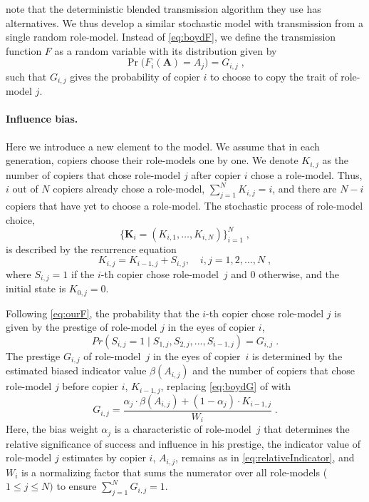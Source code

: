 \documentclass[12pt]{extarticle}
\let\vec\mathbf
\begin{document}
\citet{evolutionBook} note that the deterministic blended transmission algorithm they use has alternatives. We thus develop a similar stochastic model with transmission from a single random role-model. Instead of \cref{eq:boydF}, we define the transmission function $F$ as a random variable with its distribution given by 
\begin{equation}\label{eq:ourF}
\Pr\big(F_i(\vec{A}) = A_{j}\big) = G_{i,j} \;,
\end{equation}
such that $G_{i,j}$ gives the probability of copier $i$ to choose to copy the trait of role-model $j$.

\paragraph{Influence bias.}
Here we introduce a new element to the model.
We assume that in each generation, copiers choose their role-models one by one.
We denote $K_{i,j}$ as the number of copiers that chose role-model $j$ after copier $i$ chose a role-model. Thus, $i$ out of $N$ copiers already chose a role-model, $\sum_{j=1}^N{K_{i,j}} = i$, and there are $N-i$ copiers that have yet to choose a role-model.
The stochastic process of role-model choice, 
\begin{equation} \label{eq:process}
\big\{\vec{K}_i = (K_{i,1}, \ldots, K_{i,N}) \big\}_{i=1}^N \;,
\end{equation}
is described by the recurrence equation
\begin{equation} \label{eq:recurrence}
K_{i,j} = K_{i-1,j} + S_{i,j}, \quad i,j=1,2,\ldots,N \;,
\end{equation}
where $S_{i,j}=1$ if the $i$-th copier chose role-model~$j$ and 0 otherwise, and the initial state is $K_{0,j}=0$.

Following \cref{eq:ourF}, the probability that the $i$-th copier chose role-model $j$ is given by the prestige of role-model $j$ in the eyes of copier $i$,
\begin{equation}\label{eq:recPrestige}
Pr(S_{i,j}=1 \mid S_{1,j},S_{2,j},...,S_{i-1,j}) = G_{i,j} \;.
\end{equation}
The prestige $G_{i,j}$ of role-model~$j$ in the eyes of copier~$i$ is determined by the estimated biased indicator value $\beta(A_{i,j})$ and the number of copiers that chose role-model $j$ before copier $i$, $K_{i-1,j}$, replacing \cref{eq:boydG} of \citet{evolutionBook} with
\begin{equation}\label{eq:prestige}
G_{i,j} = \frac{\alpha_j \cdot \beta(A_{i,j}) + (1-\alpha_j) \cdot K_{i-1,j}}{W_i} \;.
\end{equation}
Here, the bias weight $\alpha_j$ is a characteristic of role-model~$j$ that determines the relative significance of success and influence in his prestige, the indicator value of role-model $j$ estimates by copier $i$, $A_{i,j}$, remains as in \cref{eq:relativeIndicator}, and $W_i$ is a normalizing factor that sums the numerator over all role-models ($1\le j \le N)$ to ensure $\sum_{j=1}^{N}{G_{i,j}}=1$.
\end{document}
